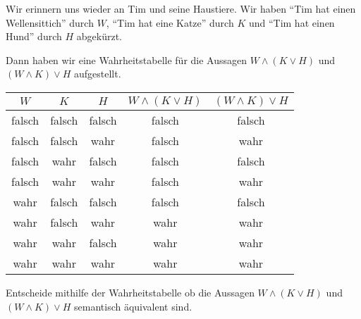 \documentclass{uebungsblatt}
\begin{document}
\begin{exercise}
    Wir erinnern uns wieder an Tim und seine Haustiere. Wir haben
    \enquote{Tim hat einen Wellensittich} durch $W$, \enquote{Tim hat eine Katze} durch $K$ und
    \enquote{Tim hat einen Hund} durch $H$ abgekürzt.

    Dann haben wir eine Wahrheitstabelle für die Aussagen $W \land (K \lor H)$ und $(W \land K) \lor H$
    aufgestellt.

    \begin{center}
        \begin{tabular}{ccc cc}\toprule
            $W$ &$K$ & $H$ & $W \land (K \lor H)$ & $(W \land K) \lor H$\\\midrule
            falsch & falsch & falsch & falsch & falsch\\ 
            falsch & falsch & wahr & falsch & wahr \\
            falsch & wahr & falsch & falsch & falsch\\
            falsch & wahr & wahr & falsch & wahr\\
            wahr & falsch & falsch & falsch &  falsch \\
            wahr & falsch & wahr & wahr & wahr\\
            wahr & wahr & falsch & wahr & wahr\\
            wahr & wahr & wahr & wahr & wahr \\\bottomrule
        \end{tabular}
    \end{center}

    Entscheide mithilfe der Wahrheitstabelle ob die Aussagen $W \land (K \lor H)$ und $(W \land K) \lor H$ semantisch
    äquivalent sind.

    \begin{answerbox}[1in]
    \end{answerbox}
\end{exercise}

\end{document}
